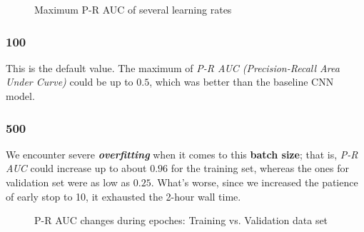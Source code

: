 \documentclass[
]{article}
\begin{document}
\begin{figure}[htbp]
\centering
{}
\caption{Maximum P-R AUC of several learning rates}
\end{figure}

\hypertarget{section-2}{%
\subsubsection{100}\label{section-2}}

This is the default value. The maximum of \emph{P-R AUC
(Precision-Recall Area Under Curve)} could be up to \(0.5\), which was
better than the baseline CNN model.

\hypertarget{section-3}{%
\subsubsection{500}\label{section-3}}

We encounter severe \emph{\textbf{overfitting}} when it comes to this
\textbf{batch size}; that is, \emph{P-R AUC} could increase up to about
\(0.96\) for the training set, whereas the ones for validation set were
as low as \(0.25\). What's worse, since we increased the patience of
early stop to 10, it exhausted the 2-hour wall time.

\begin{figure}[htbp]
\centering
{}
\caption{P-R AUC changes during epoches: Training vs. Validation data set}
\end{figure}
\end{document}
